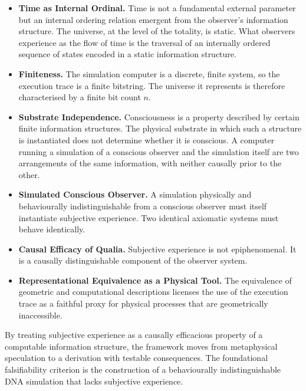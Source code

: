 \documentclass[11pt]{article}
\begin{document}
\begin{itemize}

\item \textbf{Time as Internal Ordinal.} Time is not a fundamental external
parameter but an internal ordering relation emergent from the observer's
information structure. The universe, at the level of the totality, is static.
What observers experience as the flow of time is the traversal of an
internally ordered sequence of states encoded in a static information
structure.

\item \textbf{Finiteness.} The simulation computer is a discrete,
finite system, so the execution trace is a finite bitstring. The universe
it represents is therefore characterised by a finite bit count $n$.

\item \textbf{Substrate Independence.} Consciousness is a property described by
certain finite information structures. The physical substrate in which such
a structure is instantiated does not determine whether it is conscious. A
computer running a simulation of a conscious observer and the simulation
itself are two arrangements of the same information, with neither causally
prior to the other.

\item \textbf{Simulated Conscious Observer.} A simulation physically and
behaviourally indistinguishable from a conscious observer must itself
instantiate subjective experience. Two identical axiomatic systems must behave
identically.

\item \textbf{Causal Efficacy of Qualia.} Subjective experience is not
epiphenomenal. It is a causally distinguishable component of the observer
system.

\item \textbf{Representational Equivalence as a Physical Tool.} The
equivalence of geometric and computational descriptions licenses the use of
the execution trace as a faithful proxy for physical processes that are
geometrically inaccessible. 
\end{itemize}

By treating subjective experience as a causally efficacious property of a
computable information structure, the framework moves from metaphysical
speculation to a derivation with testable consequences. The foundational
falsifiability criterion is the construction of a behaviourally
indistinguishable DNA simulation that lacks subjective experience. 


\printbibliography
\end{document}
